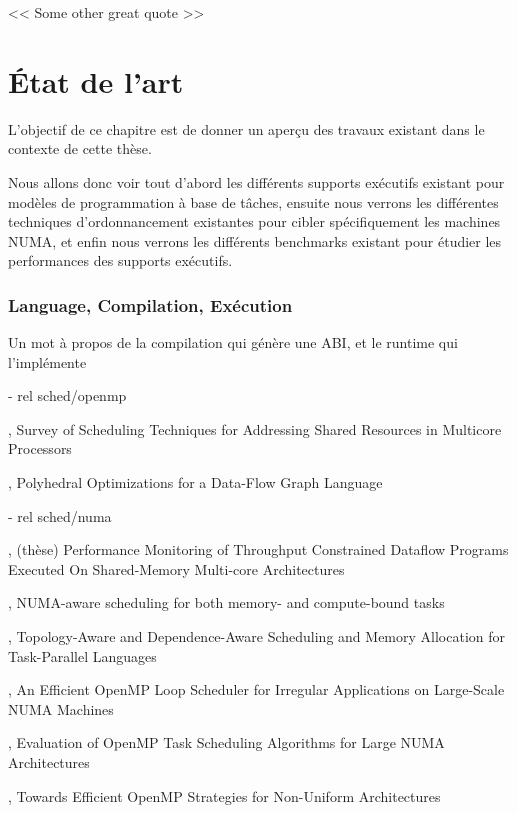 
\begin{savequote}[6cm]
<< Some other great quote  >>
\end{savequote}
\chapter{État de l'art}
\chaptertoc

L'objectif de ce chapitre est de donner un aperçu des travaux existant dans le contexte de cette thèse.

Nous allons donc voir tout d'abord les différents supports exécutifs existant pour modèles de programmation à base de tâches, ensuite nous verrons les différentes techniques d'ordonnancement existantes pour cibler spécifiquement les machines NUMA, et enfin nous verrons les différents benchmarks existant pour étudier les performances des supports exécutifs.



\subsection*{Language, Compilation, Exécution}
Un mot à propos de la compilation qui génère une ABI, et le runtime qui l'implémente



  - rel sched/openmp

\cite{Zhuravlev2012}, Survey of Scheduling Techniques for Addressing Shared Resources in Multicore Processors

\cite{Sbirlea2015}, Polyhedral Optimizations for a Data-Flow Graph Language

  - rel sched/numa

\cite{Selva2015}, (thèse) Performance Monitoring of Throughput Constrained Dataflow Programs Executed On Shared-Memory Multi-core Architectures

\cite{Reinman2015}, NUMA-aware scheduling for both memory- and compute-bound tasks

\cite{Drebes2014}, Topology-Aware and Dependence-Aware Scheduling and Memory Allocation for Task-Parallel Languages

\cite{Durand2013}, An Efficient OpenMP Loop Scheduler for Irregular Applications on Large-Scale NUMA Machines

\cite{Clet2014}, Evaluation of OpenMP Task Scheduling Algorithms for Large NUMA Architectures

\cite{Tahan2014}, Towards Efficient OpenMP Strategies for Non-Uniform Architectures

